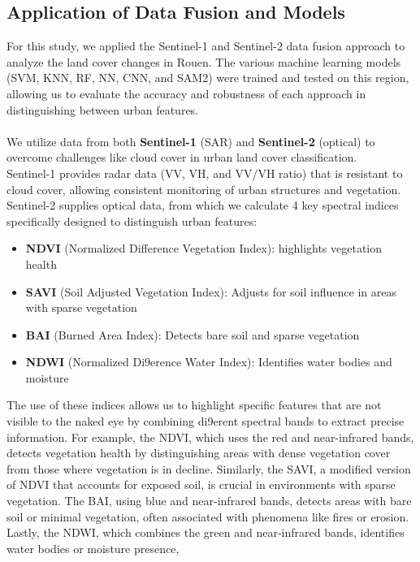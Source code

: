 \documentclass[usenatbib]{tjaa}
\begin{document}
\subsection*{Application of Data Fusion and Models}
\noindent
For this study, we applied the Sentinel-1 and Sentinel-2 data fusion approach to analyze the land
cover changes in Rouen. The various machine learning models (SVM, KNN, RF, NN, CNN, and
SAM2) were trained and tested on this region, allowing us to evaluate the accuracy and
robustness of each approach in distinguishing between urban features.
\\
\\
\noindent
We utilize data from both \textbf{Sentinel-1} (SAR) and \textbf{Sentinel-2} (optical) to overcome challenges like
cloud cover in urban land cover classification. \\
Sentinel-1 provides radar data (VV, VH, and VV/VH ratio) that is resistant to cloud cover, allowing
consistent monitoring of urban structures and vegetation. \\
Sentinel-2 supplies optical data, from which we calculate 4 key spectral indices specifically
designed to distinguish urban features:
\begin{itemize}
  \item \textbf{NDVI} (Normalized Difference Vegetation Index): highlights vegetation health
  \item \textbf{SAVI} (Soil Adjusted Vegetation Index): Adjusts for soil inﬂuence in areas with sparse vegetation
  \item \textbf{BAI} (Burned Area Index): Detects bare soil and sparse vegetation
  \item \textbf{NDWI} (Normalized Di9erence Water Index): Identiﬁes water bodies and moisture
\end{itemize}
The use of these indices allows us to highlight speciﬁc features that are not visible to the naked
eye by combining di9erent spectral bands to extract precise information. For example, the NDVI,
which uses the red and near-infrared bands, detects vegetation health by distinguishing areas
with dense vegetation cover from those where vegetation is in decline. Similarly, the SAVI, a
modiﬁed version of NDVI that accounts for exposed soil, is crucial in environments with sparse
vegetation. The BAI, using blue and near-infrared bands, detects areas with bare soil or minimal
vegetation, often associated with phenomena like ﬁres or erosion. Lastly, the NDWI, which
combines the green and near-infrared bands, identiﬁes water bodies or moisture presence,
\end{document}
